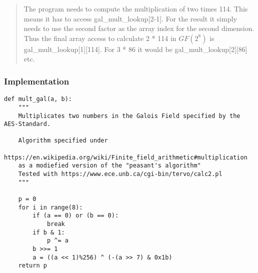 \begin{quote}
The program needs to compute the multiplication of two times 114. This
means it has to access gal\_mult\_lookup{[}2-1{]}. For the result it
simply needs to use the second factor as the array index for the second
dimension. Thus the final array access to calculate 2 * 114 in $GF(2^{8})$ is
gal\_mult\_lookup{[}1{]}{[}114{]}. For 3 * 86 it would be
gal\_mult\_lookup{[}2{]}{[}86{]} etc.
\end{quote}

\hypertarget{implementation}{%
\subsubsection{Implementation}\label{implementation}}

\begin{lstlisting}
def mult_gal(a, b):
    """
    Multiplicates two numbers in the Galois Field specified by the AES-Standard.

    Algorithm specified under
    https://en.wikipedia.org/wiki/Finite_field_arithmetic#multiplication
    as a modiefied version of the "peasant's algorithm"
    Tested with https://www.ece.unb.ca/cgi-bin/tervo/calc2.pl
    """
    
    p = 0
    for i in range(8):
        if (a == 0) or (b == 0):
            break
        if b & 1:
            p ^= a
        b >>= 1
        a = ((a << 1)%256) ^ (-(a >> 7) & 0x1b)
    return p
\end{lstlisting}

